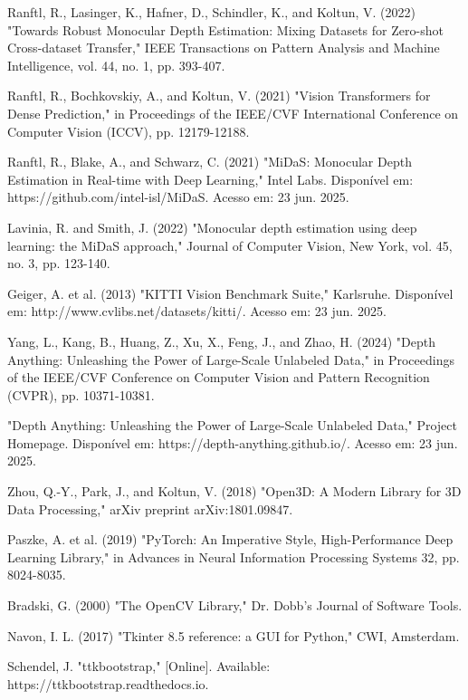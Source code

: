 \documentclass{SBCbookchapter}
\begin{document}
    \begin{thebibliography}{99}
         Ranftl, R., Lasinger, K., Hafner, D., Schindler, K.,
            and Koltun, V. (2022) "Towards Robust Monocular Depth Estimation: Mixing
            Datasets for Zero-shot Cross-dataset Transfer," IEEE Transactions on
            Pattern Analysis and Machine Intelligence, vol. 44, no. 1, pp. 393-407.

         Ranftl, R., Bochkovskiy, A., and Koltun, V. (2021) "Vision
            Transformers for Dense Prediction," in Proceedings of the IEEE/CVF
            International Conference on Computer Vision (ICCV), pp. 12179-12188.

         Ranftl, R., Blake, A., and Schwarz, C. (2021) "MiDaS:
            Monocular Depth Estimation in Real-time with Deep Learning," Intel Labs.
            Disponível em: https://github.com/intel-isl/MiDaS. Acesso em: 23 jun.
            2025.

         Lavinia, R. and Smith, J. (2022) "Monocular depth
            estimation using deep learning: the MiDaS approach," Journal of Computer
            Vision, New York, vol. 45, no. 3, pp. 123-140.

         Geiger, A. et al. (2013) "KITTI Vision Benchmark Suite,"
            Karlsruhe. Disponível em: http://www.cvlibs.net/datasets/kitti/. Acesso
            em: 23 jun. 2025.

         Yang, L., Kang, B., Huang, Z., Xu, X., Feng, J., and
            Zhao, H. (2024) "Depth Anything: Unleashing the Power of Large-Scale
            Unlabeled Data," in Proceedings of the IEEE/CVF Conference on
            Computer Vision and Pattern Recognition (CVPR), pp. 10371-10381.

         "Depth Anything: Unleashing the Power of Large-Scale
            Unlabeled Data," Project Homepage. Disponível em: https://depth-anything.github.io/.
            Acesso em: 23 jun. 2025.

         Zhou, Q.-Y., Park, J., and Koltun, V. (2018) "Open3D:
            A Modern Library for 3D Data Processing," arXiv preprint arXiv:1801.09847.

         Paszke, A. et al. (2019) "PyTorch: An Imperative
            Style, High-Performance Deep Learning Library," in Advances in Neural
            Information Processing Systems 32, pp. 8024-8035.

         Bradski, G. (2000) "The OpenCV Library," Dr. Dobb's
            Journal of Software Tools.

         Navon, I. L. (2017) "Tkinter 8.5 reference: a GUI
            for Python," CWI, Amsterdam.

         Schendel, J. "ttkbootstrap," [Online]. Available:
            https://ttkbootstrap.readthedocs.io.
    \end{thebibliography}
\end{document}
